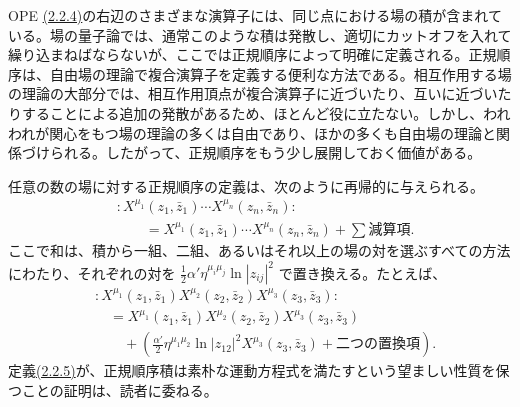 OPE \hyperref[eq:2.2.4]{(2.2.4)}の右辺のさまざまな演算子には、同じ点における場の積が含まれている。場の量子論では、通常このような積は発散し、適切にカットオフを入れて繰り込まねばならないが、ここでは正規順序によって明確に定義される。正規順序は、自由場の理論で複合演算子を定義する便利な方法である。相互作用する場の理論の大部分では、相互作用頂点が複合演算子に近づいたり、互いに近づいたりすることによる追加の発散があるため、ほとんど役に立たない。しかし、われわれが関心をもつ場の理論の多くは自由であり、ほかの多くも自由場の理論と関係づけられる。したがって、正規順序をもう少し展開しておく価値がある。

任意の数の場に対する正規順序の定義は、次のように再帰的に与えられる。
\begin{equation}
\begin{aligned}
&:X^{\mu_1}(z_1,\bar z_1)\cdots X^{\mu_n}(z_n,\bar z_n):\\
&\qquad=X^{\mu_1}(z_1,\bar z_1)\cdots X^{\mu_n}(z_n,\bar z_n)
+\sum\text{減算項}.
\end{aligned}
\tag{2.2.5}\label{eq:2.2.5}
\end{equation}
ここで和は、積から一組、二組、あるいはそれ以上の場の対を選ぶすべての方法にわたり、それぞれの対を $\tfrac12\alpha'\eta^{\mu_i\mu_j}\ln|z_{ij}|^2$ で置き換える。たとえば、
\begin{equation}
\begin{aligned}
&:X^{\mu_1}(z_1,\bar z_1)X^{\mu_2}(z_2,\bar z_2)X^{\mu_3}(z_3,\bar z_3):\\
&\quad=X^{\mu_1}(z_1,\bar z_1)X^{\mu_2}(z_2,\bar z_2)X^{\mu_3}(z_3,\bar z_3)\\
&\qquad+\left(\frac{\alpha'}2\eta^{\mu_1\mu_2}\ln|z_{12}|^2
X^{\mu_3}(z_3,\bar z_3)+\text{二つの置換項}\right).
\end{aligned}
\tag{2.2.6}\label{eq:2.2.6}
\end{equation}
定義\hyperref[eq:2.2.5]{(2.2.5)}が、正規順序積は素朴な運動方程式を満たすという望ましい性質を保つことの証明は、読者に委ねる。

